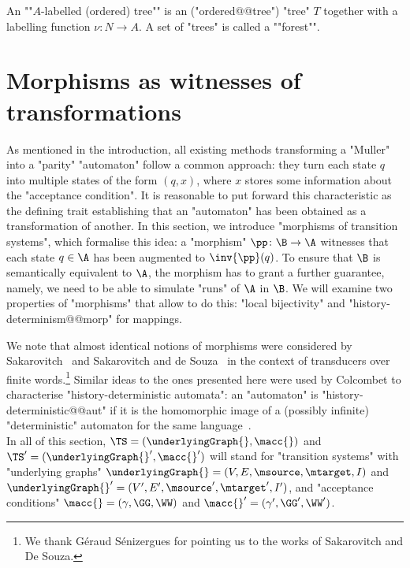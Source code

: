 \documentclass[10pt,a4paper]{amsart}
\renewcommand{\gg}{\gamma}
\begin{document}
\AP An ""$A$-labelled (ordered) tree"" is an ("ordered@@tree") "tree" $T$ together with a labelling function $\nu \colon N \to A$.
\AP A set of "trees" is called a ""forest"".

 	
	\section{Morphisms as witnesses of transformations}\label{section:morphisms}
	As mentioned in the introduction, all existing methods transforming a "Muller" into a "parity" "automaton" follow a common approach: they turn each state $q$ into multiple states of the form $(q,x)$, where $x$ stores some information about the "acceptance condition". 
It is reasonable to put forward this characteristic as the defining trait establishing that an "automaton" has been obtained as a transformation of another.
In this section, we introduce "morphisms of transition systems", which formalise this idea: a "morphism" $\pp \colon \B\to \A$ witnesses that each state $q\in \A$ has been augmented to $\inv{\pp}(q)$. To ensure that $\B$ is semantically equivalent to $\A$, the morphism has to grant a further guarantee, namely, we need to be able to simulate "runs" of $\A$ in $\B$. We will examine two properties of "morphisms" that allow to do this: "local bijectivity" and "history-determinism@@morp" for mappings.

We note that almost identical notions of morphisms were considered by Sakarovitch~\cite[Section~2]{Sakarovitch98Hidden} and Sakarovitch and de Souza~\cite[Section~2.5]{SS10LexDecomposition} in the context of transducers over finite words.\footnote{We thank Géraud Sénizergues for pointing us to the works of Sakarovitch and De Souza.}
Similar ideas to the ones presented here were used by Colcombet to characterise "history-deterministic automata": an "automaton" is "history-deterministic@@aut" if it is the homomorphic image of a (possibly infinite) "deterministic" automaton for the same language~\cite[Definition~13]{Colcombet2012FormsND}.\\



In all of this section, $\TS = (\underlyingGraph{}, \macc{})$ and $\TS' = (\underlyingGraph{}', \macc{}')$ will stand for "transition systems" with "underlying graphs" $\underlyingGraph{} =(V ,E , \msource , \mtarget, I)$ and $\underlyingGraph{}' =(V' ,E' , \msource' , \mtarget', I')$, and "acceptance conditions" $\macc{} = (\gg, \GG, \WW)$ and  $\macc{}' = (\gg', \GG', \WW')$.
\end{document}
